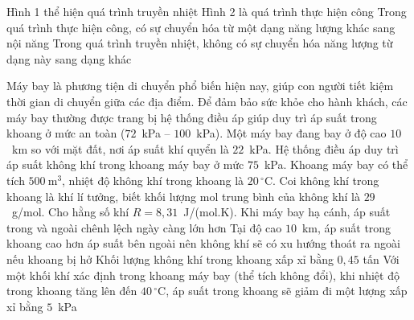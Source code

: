 \begin{ex}
\begin{center}
\begin{tikzpicture}[scale=1.1,line join=round,line cap=round,font=\footnotesize]
			\end{tikzpicture}
		\end{center}
		\choiceTFt
		{Hình 1 thể hiện quá trình truyền nhiệt}
		{Hình 2 là quá trình thực hiện công}
		{\True Trong quá trình thực hiện công, có sự chuyển hóa từ một dạng năng lượng khác sang nội năng}
		{\True Trong quá trình truyền nhiệt, không có sự chuyển hóa năng lượng từ dạng này sang dạng khác}
	\end{ex}

	\begin{ex}%
		Máy bay là phương tiện di chuyển phổ biến hiện nay, giúp con người tiết kiệm thời gian di chuyển giữa các địa điểm. Để đảm bảo sức khỏe cho hành khách, các máy bay thường được trang bị hệ thống điều áp giúp duy trì áp suất trong khoang ở mức an toàn ($72$~kPa -- $100$~kPa). Một máy bay đang bay ở độ cao $10$~km so với mặt đất, nơi áp suất khí quyển là $22$~kPa. Hệ thống điều áp duy trì áp suất không khí trong khoang máy bay ở mức $75$~kPa. Khoang máy bay có thể tích $500~\text{m}^3$, nhiệt độ không khí trong khoang là $20\,^\circ\text{C}$. Coi không khí trong khoang là khí lí tưởng, biết khối lượng mol trung bình của không khí là $29$~g/mol. Cho hằng số khí $R=8{,}31$~J/(mol.K).
		\choiceTFt
		{Khi máy bay hạ cánh, áp suất trong và ngoài chênh lệch ngày càng lớn hơn}
		{\True Tại độ cao $10$~km, áp suất trong khoang cao hơn áp suất bên ngoài nên không khí sẽ có xu hướng thoát ra ngoài nếu khoang bị hở}
		{\True Khối lượng không khí trong khoang xấp xỉ bằng $0{,}45$ tấn}
		{Với một khối khí xác định trong khoang máy bay (thể tích không đổi), khi nhiệt độ trong khoang tăng lên đến $40\,^\circ\text{C}$, áp suất trong khoang sẽ giảm đi một lượng xấp xỉ bằng $5$~kPa}
	\end{ex}

